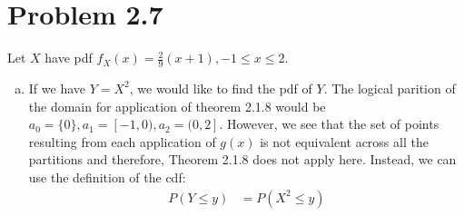 \documentclass[11pt]{article}
\begin{document}
\section*{Problem 2.7}

Let $X$ have pdf $f_X(x) = \frac{2}{9} (x + 1), -1 \le x \le 2$.

\begin{enumerate}[(a)]
    \item If we have $Y = X^2$, we would like to find the pdf of $Y$.  The logical parition of the domain for application of theorem 2.1.8 would be $a_0 = \{0\}, a_1 = [-1, 0), a_2 = (0, 2]$.  However, we see that the set of points resulting from each application of $g(x)$ is not equivalent across all the partitions and therefore, Theorem 2.1.8 does not apply here.  Instead, we can use the definition of the cdf:
        \begin{align*}
            P(Y \le y) &= P(X^2 \le y)
        \end{align*}
\end{enumerate}
\end{document}

